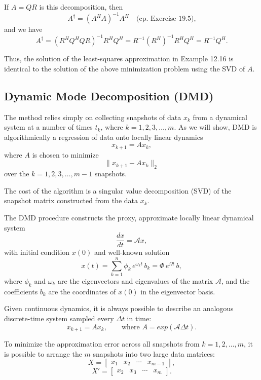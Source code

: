 \documentclass{article}
\begin{document}
If $A = QR$ is this decomposition, then
\[
A^{\dagger} = (A^H A)^{-1} A^H 
\quad \text{(cp.\ Exercise 19.5),}
\]
and we have
\[
A^{\dagger} = (R^H Q^H Q R)^{-1} R^H Q^H 
= R^{-1} (R^H)^{-1} R^H Q^H 
= R^{-1} Q^H.
\]

Thus, the solution of the least-squares approximation in Example 12.16 is identical 
to the solution of the above minimization problem using the SVD of $A$.


\newpage

\subsection{Dynamic Mode Decomposition (DMD)}

\vspace{1cm}

The method relies simply on collecting snapshots of data $x_k$ from a dynamical system 
at a number of times $t_k$, where $k = 1,2,3,\dots,m$. As we will show, DMD is 
algorithmically a regression of data onto locally linear dynamics
\[
x_{k+1} = A x_k,
\]
where $A$ is chosen to minimize
\[
\| x_{k+1} - A x_k \|_2
\]
over the $k = 1,2,3,\dots,m-1$ snapshots.  

The cost of the algorithm is a singular 
value decomposition (SVD) of the snapshot matrix constructed from the data $x_k$.

The DMD procedure constructs the proxy, approximate locally linear dynamical system
\[
\frac{d x}{dt} = \mathcal{A}x  ,
\]
with initial condition $x(0)$ and well-known solution 
\[
x(t) = \sum_{k=1}^n \phi_k \, e^{\omega_k t} \, b_k 
= \Phi \, e^{\Omega t} \, b,
\]
where $\phi_k$ and $\omega_k$ are the eigenvectors and eigenvalues of the matrix $\mathcal{A}$, 
and the coefficients $b_k$ are the coordinates of $x(0)$ in the eigenvector basis.  

Given continuous dynamics, it is always possible to describe an analogous 
discrete-time system sampled every $\Delta t$ in time:
\[
x_{k+1} = A x_k,
\qquad \text{where } A = exp{(\mathcal{A} \Delta t)}.
\]

To minimize the approximation error across all snapshots from 
$k = 1,2,\dots,m$, it is possible to arrange the $m$ snapshots into two large data matrices:
\[
X =
\begin{bmatrix}
x_1 & x_2 & \cdots & x_{m-1}
\end{bmatrix},
\]
\[
X' =
\begin{bmatrix}
x_2 & x_3 & \cdots & x_m
\end{bmatrix}.
\]
\end{document}
